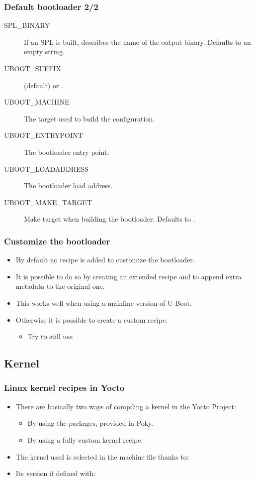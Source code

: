 \begin{frame}
  \frametitle{Default bootloader 2/2}
  \begin{description}
    \item[SPL\_BINARY] If an SPL is built, describes the name of the
      output binary. Defaults to an empty string.
    \item[UBOOT\_SUFFIX]  (default) or .
    \item[UBOOT\_MACHINE] The target used to build the configuration.
    \item[UBOOT\_ENTRYPOINT] The bootloader entry point.
    \item[UBOOT\_LOADADDRESS] The bootloader load address.
    \item[UBOOT\_MAKE\_TARGET] Make target when building the
      bootloader.  Defaults to .
  \end{description}
\end{frame}

\begin{frame}
  \frametitle{Customize the bootloader}
  \begin{itemize}
    \item By default no recipe is added to customize the bootloader.
    \item It is possible to do so by creating an extended recipe and
      to append extra metadata to the original one.
    \item This works well when using a mainline version of U-Boot.
    \item Otherwise it is possible to create a custom recipe.
      \begin{itemize}
        \item Try to still use
      \end{itemize}
  \end{itemize}
\end{frame}

\subsection{Kernel}

\begin{frame}
  \frametitle{Linux kernel recipes in Yocto}
  \begin{itemize}
    \item There are basically two ways of compiling a kernel in the
      Yocto Project:
      \begin{itemize}
        \item By using the  packages, provided in
          Poky.
        \item By using a fully custom kernel recipe.
      \end{itemize}
    \item The kernel used is selected in the machine file thanks to:
    \item Its version if defined with:
  \end{itemize}
\end{frame}

